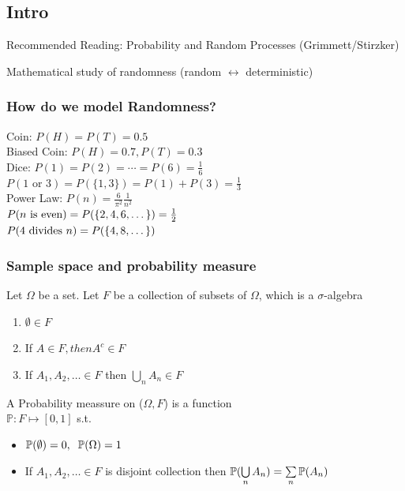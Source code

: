 \subsection{Intro}

Recommended Reading: Probability and Random Processes (Grimmett/Stirzker)

Mathematical study of randomness (random $\leftrightarrow$ deterministic)

\subsubsection*{How do we model Randomness?}

Coin: $P(H)=P(T)=0.5$\\
Biased Coin: $P(H)=0.7, P(T)=0.3$\\
Dice: $P(1)=P(2)=\cdots=P(6)=\frac{1}{6}$\\
$P(1 \text{ or } 3)=P(\{1,3\})=P(1)+P(3)=\frac{1}{3}$\\
Power Law: $P(n)=\frac{6}{\pi^2}\frac{1}{n^2}$\\
$P(n\t{ is even})=P(\{2,4,6,\dots\})=\frac{1}{2}$\\
$P(\t{4 divides }n)=P(\{4,8,\dots\})$\\

\subsubsection*{Sample space and probability measure}

\begin{definition}
    Let $\Omega$ be a set. Let $F$ be a collection of subsets of $\Omega$, which is a $\sigma$-algebra
    \begin{enumerate}
        \item $\emptyset \in F$
        \item If $A \in F, then A^c \in F$
        \item If $A_1,A_2,\dots \in F$ then $\bigcup\limits_n A_n \in F$
    \end{enumerate}
\end{definition}

\begin{definition}
    A Probability meassure on ($\Omega, F$) is a function\\
    $\mathbb{P}: F \mapsto [0,1]$ s.t.
    \begin{itemize}
        \item $\P(\emptyset) = 0,\;\;\P(\Omega)=1$
        \item If $A_1,A_2,\dots\in F$ is disjoint collection then $\P(\bigcup\limits_n A_n)=\sum\limits_n \P(A_n)$
    \end{itemize}
\end{definition}

